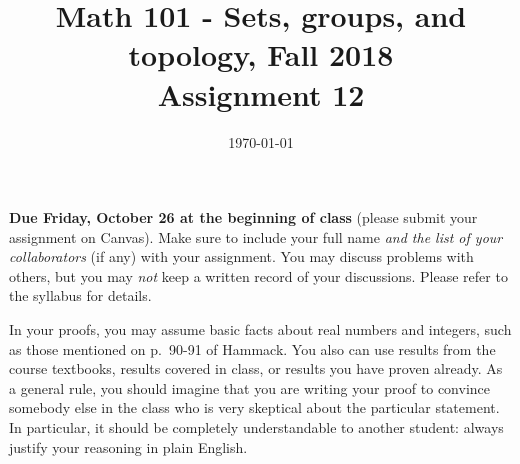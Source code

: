 \documentclass{amsart}
\title[Math 101, Fall 2018: assignment 12]{Math 101 - Sets, groups, and topology, Fall 2018 \\ Assignment 12}
\date{\today}
\theoremstyle{definition}
\begin{document}

\maketitle

\textbf{Due Friday, October 26 at the beginning of class} (please submit your assignment on Canvas). Make sure to include your full name \emph{and the list of your collaborators} (if any) with your assignment. You may discuss problems with others, but you may \emph{not} keep a written record of your discussions. Please refer to the syllabus for details.

In your proofs, you may assume basic facts about real numbers and integers, such as those mentioned on p.~90-91 of Hammack. You also can use results from the course textbooks, results covered in class, or results you have proven already. As a general rule, you should imagine that you are writing your proof to convince somebody else in the class who is very skeptical about the particular statement. In particular, it should be completely understandable to another student: always justify your reasoning in plain English. 
\end{document}
